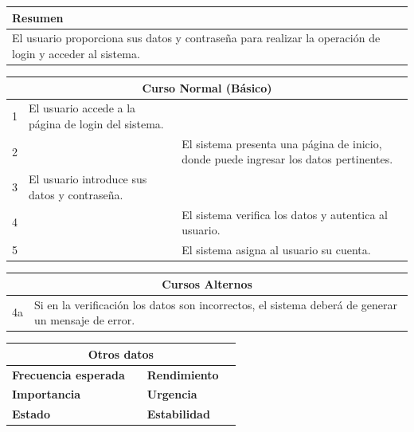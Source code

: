 \vspace{0.2cm}

\begin{table}[h!]
\centering
\begin{tabularx}{\textwidth}{|X|}
\hline
\cellcolor[HTML]{F2F2F2}\textbf{Resumen} \\ \hline
El usuario proporciona sus datos y contraseña para realizar la operación de login y acceder al sistema. \\ \hline
\end{tabularx}
\end{table}

\vspace{0.2cm}

\begin{table}[h!]
\centering
\begin{tabularx}{\textwidth}{|c|X|X|}
\hline
\multicolumn{3}{|c|}{\cellcolor[HTML]{F2F2F2}\textbf{Curso Normal (Básico)}} \\ \hline
1 & El usuario accede a la página de login del sistema. & \\ \hline
2 & & El sistema presenta una página de inicio, donde puede ingresar los datos pertinentes. \\ \hline
3 & El usuario introduce sus datos y contraseña. & \\ \hline
4 & & El sistema verifica los datos y autentica al usuario. \\ \hline
5 & & El sistema asigna al usuario su cuenta. \\ \hline
\end{tabularx}
\end{table}

\vspace{0.2cm}

\begin{table}[h!]
\centering
\begin{tabularx}{\textwidth}{|c|X|}
\hline
\multicolumn{2}{|c|}{\cellcolor[HTML]{F2F2F2}\textbf{Cursos Alternos}} \\ \hline
4a & Si en la verificación los datos son incorrectos, el sistema deberá de generar un mensaje de error. \\ \hline
\end{tabularx}
\end{table}

\vspace{0.2cm}

\begin{table}[h!]
\centering
\begin{tabularx}{\textwidth}{|X|X|X|X|}
\hline
\multicolumn{4}{|c|}{\cellcolor[HTML]{F2F2F2}\textbf{Otros datos}} \\ \hline
\textbf{Frecuencia esperada} &  & \textbf{Rendimiento} &  \\ \hline
\textbf{Importancia} &  & \textbf{Urgencia} &  \\ \hline
\textbf{Estado} &  & \textbf{Estabilidad} &  \\ \hline
\end{tabularx}
\end{table}

